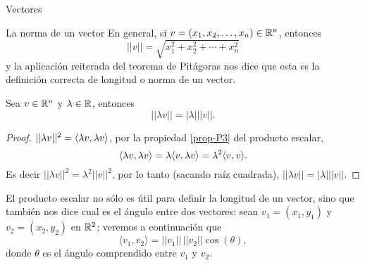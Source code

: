 \begin{chapter}{Vectores}
\begin{section}{La norma de un vector}
    En  general,  si $v =(x_1,x_2,\ldots,x_n) \in \mathbb R^n$,  entonces
    \begin{equation*}
        ||v|| = \sqrt{x_1^2+x_2^2+\cdots+x_n^2}
    \end{equation*} 
    y la aplicación reiterada del  teorema de Pitágoras nos dice que esta es la definición correcta de longitud o norma de un vector. 
    
    \begin{proposicion}\label{prop-lambda-norma}
        Sea $v \in \mathbb R^n$ y $\lambda \in \mathbb R$,  entonces
        \begin{equation*}
            ||\lambda v|| = |\lambda|||v||.
        \end{equation*}
    \end{proposicion}
    \begin{proof}
        $||\lambda v||^2 = \langle\lambda v, \lambda v \rangle$, por la propiedad \ref{prop-P3} del producto escalar, 
        \begin{equation*}
            \langle\lambda v, \lambda v \rangle = \lambda\langle v, \lambda v \rangle = \lambda^2\langle v, v  \rangle.
        \end{equation*}
        Es decir 	$||\lambda v||^2 =  \lambda^2 ||v||^2$, por lo tanto (sacando raíz cuadrada), $||\lambda v|| = |\lambda|||v||$.
    \end{proof}
    
El producto escalar no sólo es útil para definir la longitud de un vector,  sino que también nos dice cual es el ángulo entre dos vectores: sean   $v_1= (x_1,y_1)$ y $v_2= (x_2,y_2)$ en $\mathbb R^2$; veremos a continuación que 
        \begin{equation}\label{eq-cos-theta}
        \langle v_1 , v_2 \rangle = ||v_1||\, ||v_2|| \cos(\theta),
        \end{equation}
        donde  $\theta$ es el ángulo comprendido entre $v_1$ y $v_2$.
    

\end{section}
\end{chapter}
